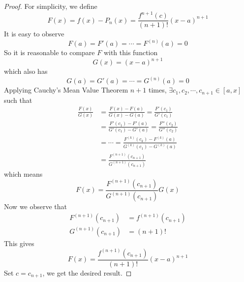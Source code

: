 \begin{proof}
For simplicity, we define
\[ F(x)=f(x)-P_n(x)=\frac{f^{n+1}(c)}{(n+1)!}(x-a)^{n+1} \]
It is easy to observe
\[ F(a)=F'(a)=\cdots=F^{(n)}(a)=0 \]
So it is reasonable to compare $F$ with this function
\[ G(x)=(x-a)^{n+1} \]
which also has
\[ G(a)=G'(a)=\cdots=G^{(n)}(a)=0 \]
Applying Cauchy's Mean Value Theorem $n+1$ times, \(\exists c_1,c_2,\cdots,c_{n+1}\in[a,x]\) such that
\begin{align*}
	\frac{F(x)}{G(x)}&=\frac{F(x)-F(a)}{G(x)-G(a)}=\frac{F'(c_1)}{G'(c_1)}\\
    &=\frac{F'(c_1)-F'(a)}{G'(c_1)-G'(a)}=\frac{F''(c_2)}{G''(c_2)}\\
    &=\cdots=\frac{F^{(k)}(c_k)-F^{(k)}(a)}{G^{(k)}(c_1)-G^{(k)}(a)}\\
    &=\frac{F^{(n+1)}(c_{n+1})}{G^{(n+1)}(c_{n+1})}
\end{align*}
which means
\[ F(x)= \frac{F^{(n+1)}(c_{n+1})}{G^{(n+1)}(c_{n+1})}G(x) \]
Now we observe that 
\begin{align*}
F^{(n+1)}(c_{n+1})&=f^{(n+1)}(c_{n+1})\\
G^{(n+1)}(c_{n+1})&=(n+1)!
\end{align*}
This gives
\[ F(x)=\frac{f^{(n+1)}(c_{n+1})}{(n+1)!}(x-a)^{n+1} \]
Set \(c=c_{n+1}\), we get the desired result.
\end{proof}

